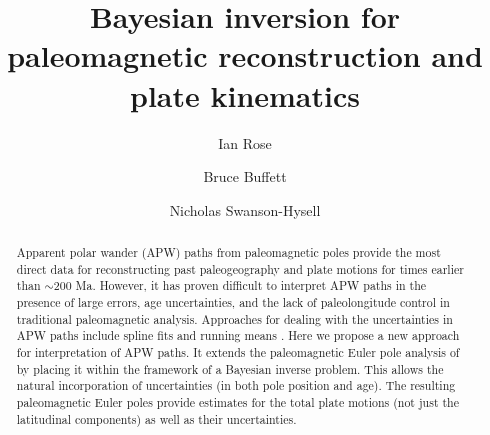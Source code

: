 \documentclass[preprint,12pt,authoryear]{elsarticle}
\begin{document}
\begin{frontmatter}



\title{Bayesian inversion for paleomagnetic reconstruction and plate kinematics}


\author{Ian Rose}
\author{Bruce Buffett}
\author{Nicholas Swanson-Hysell}


\address{}

\begin{abstract}
Apparent polar wander (APW) paths from paleomagnetic poles provide the most direct data
for reconstructing past paleogeography and plate motions for times earlier than $\sim$200 Ma. 
However, it has proven difficult to interpret APW paths in the presence of large errors,
age uncertainties, and the lack of paleolongitude control in traditional paleomagnetic analysis.
Approaches for dealing with the uncertainties in APW paths include spline fits and
running means \citep[e.g.][e.g]{torsvik2008global}.
Here we propose a new approach for interpretation of APW paths.
It extends the paleomagnetic Euler pole analysis of \citet{gordon1984paleomagnetic}
by placing it within the framework of a Bayesian inverse problem.
This allows the natural incorporation of uncertainties (in both pole position and age).
The resulting paleomagnetic Euler poles provide estimates for the total
plate motions (not just the latitudinal components) as well as their uncertainties.


\end{abstract}
\end{frontmatter}
\end{document}
